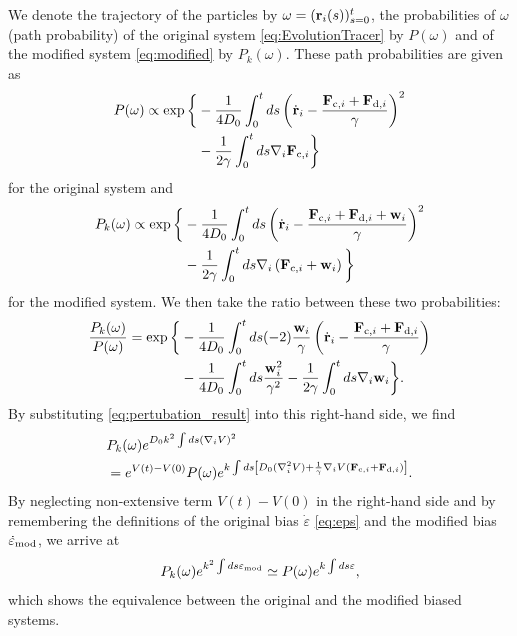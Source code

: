 \documentclass[pre, superscriptaddress, twocolumn,pre]{revtex4-1}
\begin{document}
We denote the trajectory of the particles by $\omega=({\bf r}_i(s))_{s=0}^{t}$, the probabilities of $\omega$ (path probability) of the original system \eqref{eq:EvolutionTracer} by $P(\omega)$ and of the modified system \eqref{eq:modified} by $P_{k}(\omega)$. These path probabilities are given as
\begin{equation}
\begin{split}
P(\omega)  \propto \exp \bigg \{ & - \frac{1}{4D_0} \int _0^t ds \left ( \dot{\bf r}_i - \frac{{\bf F}_{{\rm c},i} + {\bf F}_{{\rm d},i}}{\gamma} \right )^2   \\
&  - \frac{1}{2\gamma} \int _0^t ds \nabla_i {\bf F}_{{\rm c},i}  \bigg \} 
\end{split}
\end{equation}
for the original system and
\begin{equation}
\begin{split}
P_k(\omega)  \propto \exp \bigg \{ & - \frac{1}{4D_0} \int _0^t ds \left ( \dot{\bf r}_i - \frac{{\bf F}_{{\rm c},i} + {\bf F}_{{\rm d},i} + {\bf w}_i}{\gamma} \right )^2   \\
&  - \frac{1}{2\gamma} \int _0^t ds \nabla_i \left ( {\bf F}_{{\rm c},i} + {\bf w}_i \right )  \bigg \} 
\end{split}
\end{equation}
for the modified system. We then take the ratio between these two probabilities:
\begin{equation}
\begin{split}
\frac{P_k(\omega)}{P(\omega)} = \exp \bigg \{ & - \frac{1}{4D_0} \int _0^t ds (-2)\frac{{\bf w}_i}{\gamma} \left ( \dot{\bf r}_i - \frac{{\bf F}_{{\rm c},i} + {\bf F}_{{\rm d},i} }{\gamma} \right )   \\
&  - \frac{1}{4 D_0} \int _0^t ds \frac{{\bf w}_i^2}{\gamma^2}  - \frac{1}{2\gamma} \int _0^t ds \nabla_i  {\bf w}_i  \bigg \}. 
\end{split}
\end{equation}
By substituting \eqref{eq:pertubation_result} into this right-hand side, we find
\begin{equation}
\begin{split}
& P_k(\omega) e^{D_0 k^2 \int ds (\nabla_i V)^2} \\
& = e^{V(t) - V(0)} P(\omega) e^{k\int ds \left [D_0 (\nabla_i^2 V) + \frac{1}{\gamma} \nabla_i V \left ({\bf F}_{{\rm c},i} + {\bf F}_{{\rm d},i} \right ) \right ]}.
\end{split}
\end{equation}
By neglecting non-extensive term $V(t) - V(0)$ in the right-hand side and by remembering the definitions of the original bias $\dot \varepsilon$ \eqref{eq:eps} and the modified bias $\dot \varepsilon_{\rm mod}$, we arrive at 
\begin{equation}
P_k(\omega) e^{k^2 \int ds \varepsilon_{\rm mod}}  \simeq P(\omega) e^{k \int ds \varepsilon },
\end{equation}
which shows the equivalence between the original and the modified biased systems. 
\end{document}
